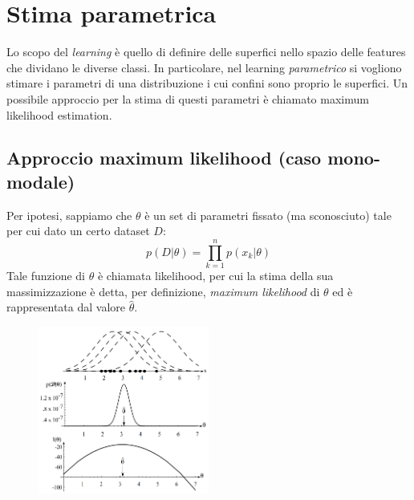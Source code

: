 \documentclass[a4paper,oneside,titlepage]{book}
\begin{document}
\section{Stima parametrica}
Lo scopo del \textit{learning} è quello di definire delle superfici nello spazio delle features che dividano le diverse classi. In particolare, nel learning \textit{parametrico} si vogliono stimare i parametri di una distribuzione i cui confini sono proprio le superfici. Un possibile approccio per la stima di questi parametri è chiamato maximum likelihood estimation.

\subsection{Approccio maximum likelihood (caso mono-modale)}
Per ipotesi, sappiamo che $\theta$ è un set di parametri fissato (ma sconosciuto) tale per cui dato un certo dataset $D$:
\[ p(D|\theta) = \prod_{k=1}^n p(x_k|\theta) \]
Tale funzione di $\theta$ è chiamata likelihood, per cui la stima della sua massimizzazione è detta, per definizione, \textit{maximum likelihood} di $\theta$ ed è rappresentata dal valore $\hat{\theta}$.
\begin{figure}[htp]
	\centering
	\includegraphics[width=0.5\textwidth]{ll.png}
\end{figure}
\end{document}
